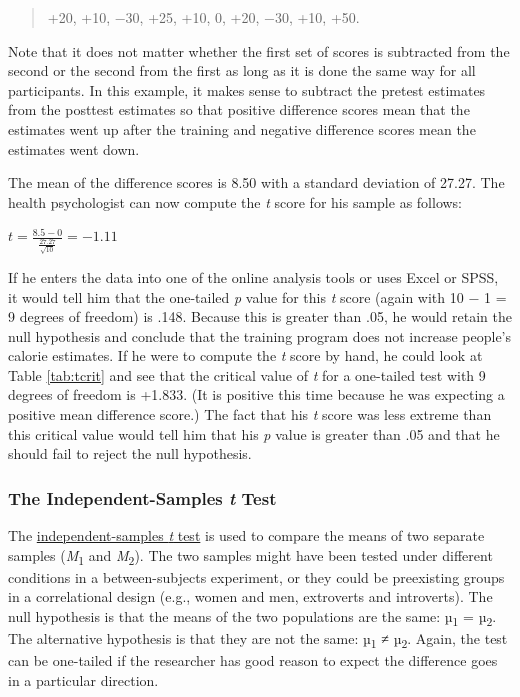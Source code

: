 \documentclass[
]{krantz}
\begin{document}
\begin{quote}
+20, +10, −30, +25, +10, 0, +20, −30, +10, +50.
\end{quote}

Note that it does not matter whether the first set of scores is subtracted from the second or the second from the first as long as it is done the same way for all participants. In this example, it makes sense to subtract the pretest estimates from the posttest estimates so that positive difference scores mean that the estimates went up after the training and negative difference scores mean the estimates went down.

The mean of the difference scores is 8.50 with a standard deviation of 27.27. The health psychologist can now compute the \emph{t} score for his sample as follows:

\(t=\frac{8.5-0}{\frac{27.27}{\sqrt{10}}}=-1.11\)

If he enters the data into one of the online analysis tools or uses Excel or SPSS, it would tell him that the one-tailed \emph{p} value for this \emph{t} score (again with 10 − 1 = 9 degrees of freedom) is .148. Because this is greater than .05, he would retain the null hypothesis and conclude that the training program does not increase people's calorie estimates. If he were to compute the \emph{t} score by hand, he could look at Table \ref{tab:tcrit} and see that the critical value of \emph{t} for a one-tailed test with 9 degrees of freedom is +1.833. (It is positive this time because he was expecting a positive mean difference score.) The fact that his \emph{t} score was less extreme than this critical value would tell him that his \emph{p} value is greater than .05 and that he should fail to reject the null hypothesis.

\hypertarget{the-independent-samples-t-test}{%
\subsubsection*{\texorpdfstring{The Independent-Samples \emph{t} Test}{The Independent-Samples t Test}}\label{the-independent-samples-t-test}}


The \protect\hyperlink{independent-samples-t-test}{independent-samples \emph{t} test} is used to compare the means of two separate samples (\emph{M}\textsubscript{1} and \emph{M}\textsubscript{2}). The two samples might have been tested under different conditions in a between-subjects experiment, or they could be preexisting groups in a correlational design (e.g., women and men, extroverts and introverts). The null hypothesis is that the means of the two populations are the same: µ\textsubscript{1} = µ\textsubscript{2}. The alternative hypothesis is that they are not the same: µ\textsubscript{1} ≠ µ\textsubscript{2}. Again, the test can be one-tailed if the researcher has good reason to expect the difference goes in a particular direction.
\end{document}
